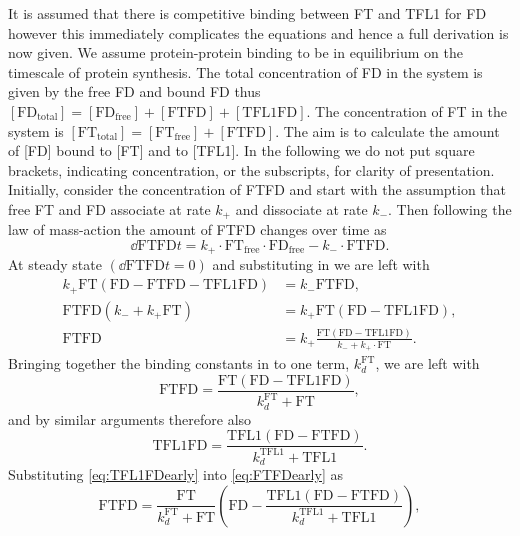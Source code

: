 It is assumed that there is competitive binding between FT and TFL1 for FD~\cite{hanano2011} however this immediately complicates the equations and hence a full derivation is now given.
We assume protein-protein binding to be in equilibrium on the timescale of protein synthesis.
The total concentration of FD in the system is given by the free FD and bound FD thus $[\mathrm{FD}_{\mathrm{total}}] = [\mathrm{FD}_{\mathrm{free}}] + [\mathrm{FTFD}] + [\mathrm{TFL1FD}]$.
The concentration of FT in the system is $[\mathrm{FT}_{\mathrm{total}}] = [\mathrm{FT}_{\mathrm{free}}] + [\mathrm{FTFD}]$.
The aim is to calculate the amount of [FD] bound to [FT] and to [TFL1].
In the following we do not put square brackets, indicating concentration, or the subscripts, for clarity of presentation.
Initially, consider the concentration of FTFD and start with the assumption that free FT and FD associate at rate $k_+$ and dissociate at rate $k_-$.
Then following the law of mass-action the amount of FTFD changes over time as
\begin{equation*}
\dd{\mathrm{FTFD}}{t} = k_+\cdot \mathrm{FT}_{\mathrm{free}}\cdot \mathrm{FD}_{\mathrm{free}} - k_-\cdot \mathrm{FTFD}.
\end{equation*}
At steady state $\left(\displaystyle\dd{\mathrm{FTFD}}{t}=0\right)$ and substituting in we are left with
\begin{align*}
k_+\mathrm{FT}\left(\mathrm{FD} - \mathrm{FTFD} - \mathrm{TFL1FD}\right) &= k_-\mathrm{FTFD}, \\
\text{FTFD}\left(k_- + k_+\text{FT}\right) &= k_+\text{FT}\left(\text{FD} - \text{TFL1FD}\right),\\
\mathrm{FTFD} &= k_+\frac{\mathrm{FT}\left(\mathrm{FD} - \mathrm{TFL1FD}\right)}{k_- + k_+\cdot \mathrm{FT}}.
\end{align*}
Bringing together the binding constants in to one term, $k_d^{\mathrm{FT}}$, we are left with
\begin{equation}\label{eq:FTFDearly}
\mathrm{FTFD} = \frac{\mathrm{FT}\left(\mathrm{FD} - \mathrm{TFL1FD}\right)}{k_d^{\mathrm{FT}} + \mathrm{FT}},
\end{equation}
and by similar arguments therefore also
\begin{equation}\label{eq:TFL1FDearly}
\mathrm{TFL1FD} = \frac{\mathrm{TFL1}\left(\mathrm{FD} - \mathrm{FTFD}\right)}{k_d^{\mathrm{TFL1}} + \mathrm{TFL1}}.
\end{equation}
Substituting \eqref{eq:TFL1FDearly} into \eqref{eq:FTFDearly} as
\begin{equation*}
\mathrm{FTFD} = \frac{\mathrm{FT}}{k_d^{\mathrm{FT}} + \mathrm{FT}}\left(\mathrm{FD} - \frac{\mathrm{TFL1}\left(\mathrm{FD} - \mathrm{FTFD}\right)}{k_d^{\mathrm{TFL1}} + \mathrm{TFL1}}\right),
\end{equation*}
